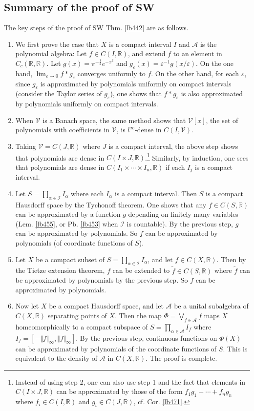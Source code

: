 \documentclass[12pt,b5paper,notitlepage]{article}
\theoremstyle{definition}
\theoremstyle{plain}
\newcommand{\mc}{\mathcal}
\newcommand{\wtd}{\widetilde}
\newcommand{\scr}{\mathscr}
\newcommand{\Rbb}{\mathbb R}
\newcommand{\eps}{\varepsilon}
\numberwithin{equation}{section}
\begin{document}
\subsection{Summary of the proof of SW}





The key steps of the proof of SW Thm. \ref{lb442} are as follows.

\begin{enumerate}
\item We first prove the case that $X$ is a compact interval $I$ and $\scr A$ is the polynomial algebra: Let $f\in C(I,\Rbb)$, and extend $f$ to an element in $C_c(\Rbb,\Rbb)$. Let $g(x)=\pi^{-\frac 12}e^{-x^2}$ and $g_\eps(x)=\eps^{-1}g(x/\eps)$. On the one hand, $\lim_{\eps\rightarrow 0}f*g_\eps$ converges uniformly to $f$. On the other hand, for each $\eps$, since $g_\eps$ is approximated by polynomials uniformly on compact intervals (consider the Taylor series of $g_\eps$), one shows that $f*g_\eps$ is also approximated by polynomials uniformly on compact intervals.  
\item When $\mc V$ is a Banach space, the same method shows that $\mc V[x]$, the set of polynomials with coefficients in $\mc V$, is $l^\infty$-dense in $C(I,\mc V)$.  
\item Taking $\mc V=C(J,\Rbb)$ where $J$ is a compact interval, the above step shows that polynomials are dense in $C(I\times J,\Rbb)$.\footnote{Instead of using step 2, one can also use step 1 and the fact that elements in $C(I\times J,\Rbb)$ can be approximated by those of the form $f_1g_1+\cdots+f_ng_n$ where $f_i\in C(I,\Rbb)$ and $g_i\in C(J,\Rbb)$, cf. Cor. \ref{lb471}.} Similarly, by induction, one sees that polynomials are dense in $C(I_1\times\cdots\times I_n,\Rbb)$ if each $I_j$ is a compact interval.
\item Let $S=\prod_{\alpha\in\scr I}I_\alpha$ where each $I_\alpha$ is a compact interval. Then $S$ is a compact Hausdorff space by the Tychonoff theorem. One shows that any $f\in C(S,\Rbb)$ can be approximated by a function $g$ depending on finitely many variables (Lem. \ref{lb455}, or Pb. \ref{lb453} when $\scr I$ is countable). By the previous step, $g$ can be approximated by polynomials. So $f$ can be approximated by polynomials (of coordinate functions of $S$).
\item Let $X$ be a compact subset of $S=\prod_{\alpha\in\scr I}I_\alpha$, and let $f\in C(X,\Rbb)$. Then by the Tietze extension theorem, $f$ can be extended to $\wtd f\in C(S,\Rbb)$ where $\wtd f$ can be approximated by polynomials by the previous step. So $f$ can be approximated by polynomials.
\item Now let $X$ be a compact Hausdorff space, and let $\scr A$ be a unital subalgebra of $C(X,\Rbb)$ separating points of $X$. Then the map $\Phi=\bigvee_{f\in\scr A}f$ maps $X$ homeomorphically to a compact subspace of $S=\prod_{\alpha\in\scr A}I_f$ where $I_f=[-\Vert f\Vert_\infty,\Vert f\Vert_\infty]$. By the previous step, continuous functions on $\Phi(X)$ can be approximated by polynomials of the coordinate functions of $S$. This is equivalent to the density of $\scr A$ in $C(X,\Rbb)$. The proof is complete.
\end{enumerate}
\end{document}

